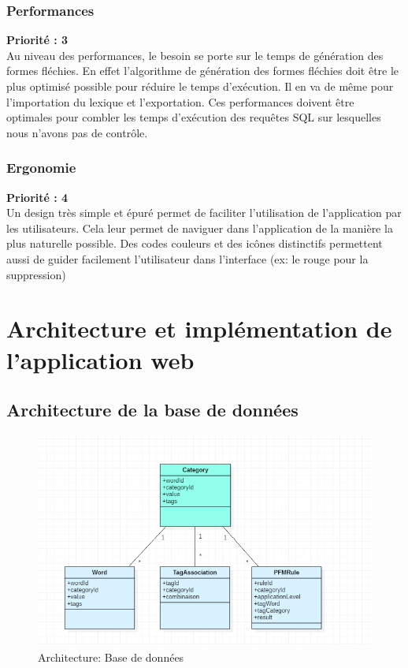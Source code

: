 \documentclass[12pt,a4paper]{article}
\begin{document}
\subsubsection{Performances}
\textbf{Priorité : 3} \\
Au niveau des performances, le besoin se porte sur le temps de génération des formes fléchies. En effet l'algorithme de génération des formes fléchies doit être le plus optimisé possible pour réduire le temps d'exécution.
Il en va de même pour l'importation du lexique et l'exportation.
Ces performances doivent être optimales pour combler les temps d'exécution des requêtes SQL sur lesquelles nous n'avons pas de contrôle.

\subsubsection{Ergonomie}
\textbf{Priorité : 4} \\
Un design très simple et épuré permet de faciliter l'utilisation de l'application par les utilisateurs. Cela leur permet de naviguer dans l'application de la manière la plus naturelle possible.
\smallbreak
Des codes couleurs et des icônes distinctifs permettent aussi de guider facilement l'utilisateur dans l'interface (ex: le rouge pour la suppression)

\newpage
\section{Architecture et implémentation de l'application web}

\subsection{Architecture de la base de données }

\begin{figure}[h]
\centering
\includegraphics[width=150mm]{img/Capture.PNG}
\caption{Architecture: Base de données}
\label{Tux}
\end{figure}
\end{document}
